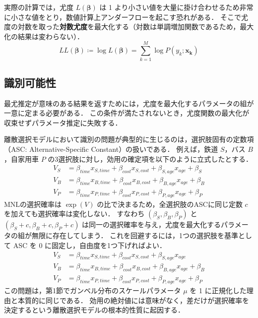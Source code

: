 実際の計算では，尤度 $L(\bm\beta)$ は 1 より小さい値を大量に掛け合わせるため非常に小さな値をとり，数値計算上アンダーフローを起こす恐れがある．
そこで尤度の対数を取った\textbf{対数尤度}を最大化する（対数は単調増加関数であるため，最大化の結果は変わらない）．
\begin{equation}
    \label{eq:log_likelihood}
    LL(\bm\beta) \coloneq\log L(\bm\beta) = \sum_{k=1}^M \log P(y_k;\bm{x_k})
\end{equation}

\subsection{識別可能性}\label{ssec:est_unique}
最尤推定が意味のある結果を返すためには，尤度を最大化するパラメータの組が一意に定まる必要がある．
この条件が満たされないとき，尤度関数の最大化が収束せずパラメータ推定に失敗する．

離散選択モデルにおいて識別の問題が典型的に生じるのは，選択肢固有の定数項（ASC: Alternative-Specific Constant）の扱いである．
例えば，鉄道 $S$，バス $B$，自家用車 $P$ の3選択肢に対し，効用の確定項を以下のように立式したとする．
\begin{equation}
    \label{eq:utility_bad}
    \begin{aligned}
        V_S & =\beta_{time}x_{S,time}+\beta_{cost} x_{S,cost}+\beta_{S,age}x_{age}+\beta_S \\
        V_B & =\beta_{time}x_{B,time}+\beta_{cost} x_{B,cost}+\beta_{B,age}x_{age}+\beta_B \\
        V_P & =\beta_{time}x_{P,time}+\beta_{cost} x_{P,cost}+\beta_{P,age}x_{age}+\beta_P
    \end{aligned}
\end{equation}
MNLの選択確率は $\exp(V)$ の比で決まるため，全選択肢のASCに同じ定数 $c$ を加えても選択確率は変化しない．
すなわち $(\beta_S, \beta_B, \beta_P)$ と $(\beta_S + c, \beta_B + c, \beta_P + c)$ は同一の選択確率を与え，尤度を最大化するパラメータの組が無限に存在してしまう．
これを回避するには，1つの選択肢を基準として ASC を 0 に固定し，自由度を1つ下げればよい．
\begin{equation}
    \label{eq:utility_good}
    \begin{aligned}
        V_S & =\beta_{time}x_{S,time}+\beta_{cost} x_{S,cost}+\beta_{S,age}x_{age}         \\
        V_B & =\beta_{time}x_{B,time}+\beta_{cost} x_{B,cost}+\beta_{B,age}x_{age}+\beta_B \\
        V_P & =\beta_{time}x_{P,time}+\beta_{cost} x_{P,cost}+\beta_{P,age}x_{age}+\beta_P
    \end{aligned}
\end{equation}
この問題は，第1節でガンベル分布のスケールパラメータ $\mu$ を 1 に正規化した理由と本質的に同じである．
効用の絶対値には意味がなく，差だけが選択確率を決定するという離散選択モデルの根本的性質に起因する．


